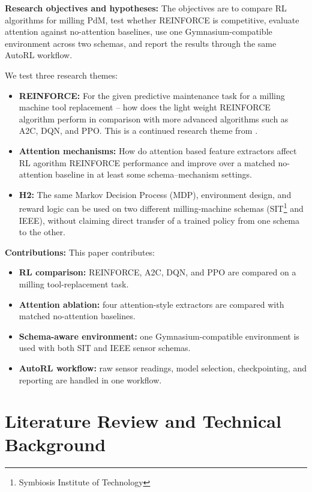\documentclass[sn-basic]{sn-jnl}%
\begin{document}
\textbf{Research objectives and hypotheses:}
The objectives are to compare RL algorithms for milling PdM, test whether \textsc{REINFORCE} is competitive, evaluate attention against no-attention baselines, use one Gymnasium-compatible environment across two schemas, and report the results through the same AutoRL workflow.

We test three research themes:
\begin{itemize}
    \item \textbf{REINFORCE:} For the given predictive maintenance task for a milling machine tool replacement -- how does the light weight \textsc{REINFORCE} algorithm perform in comparison with more advanced algorithms such as \textsc{A2C}, \textsc{DQN}, and \textsc{PPO}. This is a continued research theme from \cite{Siraskar2025}.
    \item \textbf{Attention mechanisms:} How do attention based feature extractors affect RL agorithm \textsc{REINFORCE} performance and improve over a matched no-attention baseline in at least some schema--mechanism settings.
	\item \textbf{H2:} The same Markov Decision Process (MDP), environment design, and reward logic can be used on two different milling-machine schemas (SIT\footnote{Symbiosis Institute of Technology} and IEEE), without claiming direct transfer of a trained policy from one schema to the other.
  
\end{itemize}

\textbf{Contributions:}
This paper contributes:
\begin{itemize}
    \item \textbf{RL comparison:} \textsc{REINFORCE}, \textsc{A2C}, \textsc{DQN}, and \textsc{PPO} are compared on a milling tool-replacement task.
    \item \textbf{Attention ablation:} four attention-style extractors are compared with matched no-attention baselines.
    \item \textbf{Schema-aware environment:} one Gymnasium-compatible environment is used with both SIT and IEEE sensor schemas.
    \item \textbf{AutoRL workflow:} raw sensor readings, model selection, checkpointing, and reporting are handled in one workflow.
\end{itemize}

\section{Literature Review and Technical Background}
\label{sec:lit_tech}
\end{document}
